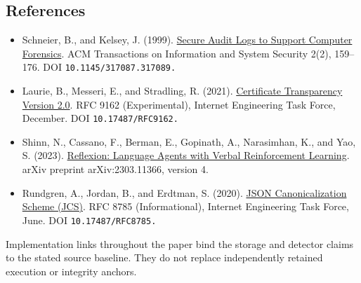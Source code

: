 \documentclass[
  11pt,
]{article}
\providecommand{\tightlist}{%
  \setlength{\itemsep}{0pt}\setlength{\parskip}{0pt}}
\begin{document}
\subsection{References}\label{references}

\begin{itemize}
\tightlist
\item
  Schneier, B., and Kelsey, J. (1999).
  \href{https://www.schneier.com/academic/archives/1999/05/secure_audit_logs_to.html}{Secure
  Audit Logs to Support Computer Forensics}. ACM Transactions on
  Information and System Security 2(2), 159--176. DOI
  \nolinkurl{10.1145/317087.317089.}
\item
  Laurie, B., Messeri, E., and Stradling, R. (2021).
  \href{https://www.rfc-editor.org/rfc/rfc9162.html}{Certificate
  Transparency Version 2.0}. RFC 9162 (Experimental), Internet
  Engineering Task Force, December. DOI \nolinkurl{10.17487/RFC9162.}
\item
  Shinn, N., Cassano, F., Berman, E., Gopinath, A., Narasimhan, K., and
  Yao, S. (2023). \href{https://arxiv.org/abs/2303.11366v4}{Reflexion:
  Language Agents with Verbal Reinforcement Learning}. arXiv preprint
  arXiv:2303.11366, version 4.
\item
  Rundgren, A., Jordan, B., and Erdtman, S. (2020).
  \href{https://www.rfc-editor.org/rfc/rfc8785.html}{JSON
  Canonicalization Scheme (JCS)}. RFC 8785 (Informational), Internet
  Engineering Task Force, June. DOI \nolinkurl{10.17487/RFC8785.}
\end{itemize}

Implementation links throughout the paper bind the storage and detector
claims to the stated source baseline. They do not replace independently
retained execution or integrity anchors.
\end{document}
